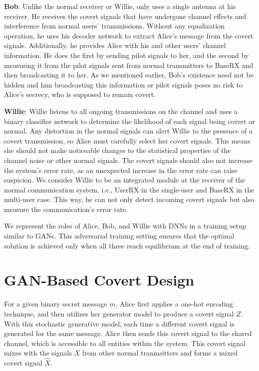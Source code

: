 \textbf{Bob}: Unlike the normal receiver or Willie, only uses a single antenna at his receiver. He receives the covert signals that have undergone channel effects and interference from normal users' transmissions. Without any equalization operation, he uses his decoder network to extract Alice's message from the covert signals. Additionally, he provides Alice with his and other users' channel information. He does the first by sending pilot signals to her, and the second by measuring it from the pilot signals sent from normal transmitters to BaseRX and then broadcasting it to her. As we mentioned earlier, Bob's existence need not be hidden and him broadcasting this information or pilot signals poses no risk to Alice's secrecy, who is supposed to remain covert.

\textbf{Willie}: Willie listens to all ongoing transmissions on the channel and uses a binary classifier network to determine the likelihood of each signal being covert or normal. Any distortion in the normal signals can alert Willie to the presence of a covert transmission, so Alice must carefully select her covert signals. This means she should not make noticeable changes to the statistical properties of the channel noise or other normal signals. The covert signals should also not increase the system's error rate, as an unexpected increase in the error rate can raise suspicion. We consider Willie to be an integrated module at the receiver of the normal communication system, i.e., UserRX in the single-user and BaseRX in the multi-user case. This way, he can not only detect incoming covert signals but also measure the communication's error rate.

We represent the roles of Alice, Bob, and Willie with DNNs in a training setup similar to GANs. This adversarial training setting ensures that the optimal solution is achieved only when all three reach equilibrium at the end of training.

\section{GAN-Based Covert Design}
For a given binary secret message \(m\), Alice first applies a one-hot encoding technique, and then utilizes her generator model to produce a covert signal \(Z\). With this stochastic generative model, each time a different covert signal is generated for the same message. Alice then sends this covert signal to the shared channel, which is accessible to all entities within the system. This covert signal mixes with the signals \(X\) from other normal tranmsitters and forms a mixed covert signal \(\hat{X}\). 

